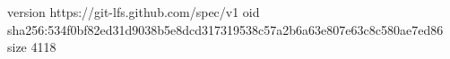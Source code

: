 version https://git-lfs.github.com/spec/v1
oid sha256:534f0bf82ed31d9038b5e8dcd317319538c57a2b6a63e807e63c8c580ae7ed86
size 4118
